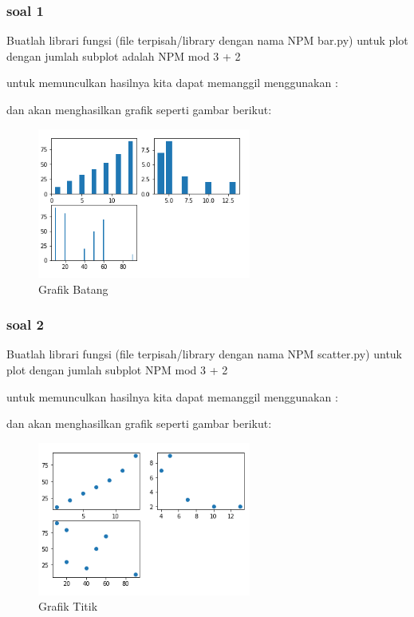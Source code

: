 \subsubsection{soal 1}
 Buatlah librari fungsi (ﬁle terpisah/library dengan nama NPM bar.py) untuk plot dengan jumlah subplot adalah NPM mod 3 + 2

untuk memunculkan hasilnya kita dapat memanggil menggunakan :


dan akan menghasilkan grafik seperti gambar berikut:
\begin{figure}[H]
\centering
\includegraphics[width=7cm]{figures/6/1174009/p1.png}
\caption{Grafik Batang}
\label{dwiyul}
\end{figure}

\subsubsection{soal 2}
Buatlah librari fungsi (ﬁle terpisah/library dengan nama NPM scatter.py) untuk plot dengan jumlah subplot NPM mod 3 + 2

untuk memunculkan hasilnya kita dapat memanggil menggunakan :


dan akan menghasilkan grafik seperti gambar berikut:
\begin{figure}[H]
\centering
\includegraphics[width=7cm]{figures/6/1174009/p2.png}
\caption{Grafik Titik}
\label{dwiyul}
\end{figure}


